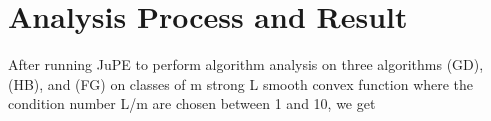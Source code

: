 \chapter{Analysis Process and Result}

After running JuPE to perform algorithm analysis on three algorithms (GD), (HB), and (FG) on classes of m strong L smooth convex function where the condition number L/m are chosen between 1 and 10, we get 
